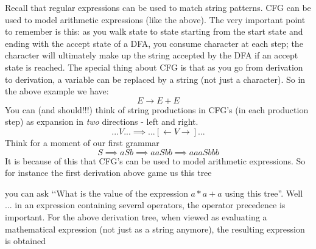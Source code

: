 Recall that regular expressions can be used to match string patterns.
CFG can be used to model arithmetic expressions (like the above).
The very important point to remember is this:
as you walk state to state starting from the start state and ending
with the accept state of a DFA, you consume character at each step;
the character will ultimately make up the string accepted by the DFA if an 
accept state is reached.
The special thing about CFG is that as you go from derivation to derivation,
a variable can be replaced by a string (not just a character).
So in the above example we have:
\[
E \rightarrow E + E
\]
You can (and should!!!) think of string productions in CFG's (in each 
production step) as expansion in \textit{ two} directions - left and right.
\[
... V ... \implies ...[\leftarrow V \rightarrow] ...
\]
Think for a moment of our first grammar
\[
S \implies aSb \implies aaSbb \implies aaa S bbb
\]
It is because of this that CFG's can be used to model arithmetic expressions.
So for instance the first derivation above game us this tree
\begin{center}
\end{center}
you can ask 
\lq\lq What is the value of the expression $a * a + a$ using this tree''.
Well ... in an expression containing several operators, the operator 
precedence is important.
For the above derivation tree, when viewed as evaluating a mathematical
expression (not just as a string anymore), the resulting expression is obtained
